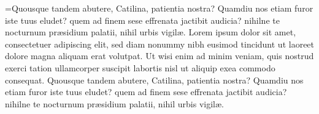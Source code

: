 \def\bisetuptype#1{%
\font\biDiamond=#1 at 4pt
\font\biPearl=#1 at 4.5pt
\font\biRuby=#1 at 5pt
\font\biNonpareil=#1 at 6pt
\font\biEmerald=#1 at 6.5pt
\font\biMinion=#1 at 7pt
\font\biBrevier=#1 at 7.5pt
\font\biBourgeois=#1 at 8pt
\font\biLongPrimer=#1 at 9pt
\font\biSmallPica=#1 at 10pt
\font\biPica=#1 at 12pt
\font\biEnglish=#1 at 14pt
\font\biGreatPrimer=#1 at 16pt
\font\biParagon=#1 at 18pt
\font\biTwolinesmallpica=#1 at 21pt
\font\biTwolinepica=#1 at 24pt}

\def\bigtosmall#1{%
\begingroup\obeylines\offinterlineskip
\fitit{#1}{\abcdwd}{ABCD}
\vfill
\fitit{#1}{\abcdwd}{ABCDE}
\vfill
\fitit{#1}{\abcdwd}{ABCDEFG}
\vfill
\fitit{#1}{\abcdwd}{ABCDEFGHI}
\vfill
\fitit{#1}{\abcdwd}{ABCDEFGHIJK}
\vfill
\fitit{#1}{\abcdwd}{ABCDEFGHIJKLMN}
\vfill
\fitit{#1}{\abcdwd}{ABCDEFGHIJKLMNOPQ}
\vfill
\fitit{#1}{\abcdwd}{ABCDEFGHIJKLMNOPQRST}
\vfill
\fitit{#1}{\abcdwd}{ABCDEFGHIJKLMNOPQRSTUVW}
\vfill
\fitit{#1}{\abcdwd}{ABCDEFGHIJKLMNOPQRSTUVWXYZ}
\endgroup}

\def\smalltobig#1{%
\begingroup\obeylines\offinterlineskip
\fitit{#1}{\abcdwd}{ABCDEFGHIJKLMNOPQRSTUVWXYZ}
\vfill
\fitit{#1}{\abcdwd}{ABCDEFGHIJKLMNOPQRSTUVW}
\vfill
\fitit{#1}{\abcdwd}{ABCDEFGHIJKLMNOPQRST}
\vfill
\fitit{#1}{\abcdwd}{ABCDEFGHIJKLMNOPQ}
\vfill
\fitit{#1}{\abcdwd}{ABCDEFGHIJKLMN}
\vfill
\fitit{#1}{\abcdwd}{ABCDEFGHIJK}
\vfill
\fitit{#1}{\abcdwd}{ABCDEFGHI}
\vfill
\fitit{#1}{\abcdwd}{ABCDEFG}
\vfill
\fitit{#1}{\abcdwd}{ABCDE}
\vfill
\fitit{#1}{\abcdwd}{ABCD}
\endgroup}

\texttoks={Quousque tandem a\-bu\-te\-re, Ca\-ti\-li\-na,
patientia nostra? Qua\-m\-diu nos etiam furor iste tuus
eludet? quem ad finem sese effrenata jactibit
audicia? nihilne te nocturnum pr\ae si\-di\-um palatii,
nihil urbis vigil\ae. Lorem ipsum dolor sit amet,
consectetuer adipiscing elit, sed diam nonummy nibh
eusi\-mod tincidunt ut laor\-eet dolore magna
ali\-quam erat volutpat. Ut wisi enim ad minim
veniam, quis nostrud exerci tation ullamcorper
suscipit la\-bortis nisl ut ali\-quip exea commodo
consequat. Quousque tandem abutere, Catilina,
patientia nostra? Quamdiu nos etiam furor iste tuus
eludet? quem ad finem sese effrenata jactibit
audicia? nihilne te nocturnum pr\ae sidium palatii,
nihil urbis vigil\ae.}

\def\textsamps#1#2#3#4{%
\begingroup#1\setleading %
\setbox0=\vbox{%
\hbadness10000\emergencystretch1em\hsize\sampletextwd\the\texttoks}%
\setbox1=\vsplit0 to #4\baselineskip
\setbox2=\vbox{#2%
\hbadness10000\emergencystretch1em\hsize\sampletextwd\the\texttoks}%
\setbox3=\vsplit2 to #4\baselineskip
\line{%
\vbox{\hsize\sampletextwd\centerline{\strut#1[#3]}\unvbox1}%
\hfill
\vbox{\hsize\sampletextwd\centerline{\strut#2[#3]}\unvbox3}\hskip.05in}%
\endgroup}

